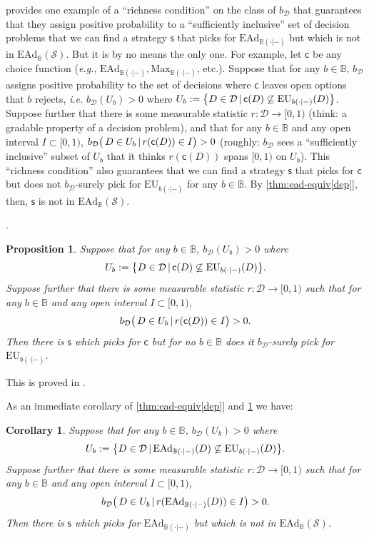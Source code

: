 \documentclass[a4paper,final]{article}
\newtheorem{proposition}[theorem]{Proposition}
\newtheorem{corollary}[theorem]{Corollary}
\newcommand\EU{\mathrm{EU}}
\newcommand\EAd{\mathrm{EAd}}
\newcommand\Maximality{\mathrm{Max}}
\newcommand{\Decs}{\mathcal{D}}
\renewcommand\S{\mathcal{S}}
\newcommand\s{\mathsf{s}}
\renewcommand\c{\mathsf{c}} %
\newcommand{\IB}{\mathbb{B}}
\renewcommand{\color}[1]{}
\newenvironment{colored}[1]{\leavevmode\color{#1}}{}
\newcommand{\Strategies}{\S}
\newcommand\SetDelimiter[1][]{
	\nonscript\,#1\vert \allowbreak \nonscript\,\mathopen{}}
\providecommand\given{\SetDelimiter}
\newenvironment{CCM rewritten}
{\begingroup\color{blue}} %
{\endgroup}              %
\begin{document}
\begin{colored}{blue}
 provides one example of a ``richness condition'' on the class of $b_\Decs$ that guarantees that they assign positive probability to a ``sufficiently inclusive'' set of decision problems that we can find a strategy $\s$ that picks for $\EAd_{\IB(\cdot|-)}$ but which is not in $\EAd_{\IB}(\S)$. But it is by no means the only one. For example, let $\c$ be any choice function (\textit{e.g.}, $\EAd_{\IB(\cdot|-)}, \Maximality_{\IB(\cdot|-)}$, etc.). Suppose that for any $b\in\IB$, $b_\Decs$ assigns positive probability to the set of decisions where $\c$ leaves open options that $b$ rejects, \textit{i.e.} $b_\Decs(U_b)>0$ where $U_b:=\bigl\{D\in\Decs\given \c(D)\not \subseteq\EU_{b(\cdot|-)}(D)\bigr\}$. Suppose further that there is some measurable statistic $r:\Decs\rightarrow[0,1)$ (think: a gradable property of a decision problem), and that for any $b\in\IB$ and any open interval $I\subset[0,1)$, $b_\Decs\bigl(\,D\in U_b\given r(\c(D))\in I \bigr)>0$ (roughly: $b_\Decs$ sees a ``sufficiently inclusive'' subset of $U_b$ that it thinks $r(\c(D))$ spans $[0,1)$ on $U_b$). This ``richness condition'' also guarantees that we can find a strategy $\s$ that picks for $\c$ but does not $b_\Decs$-surely pick for $\EU_{b(\cdot|-)}$ for any $b\in\IB$. By \cref{thm:ead-equiv[dep]}, then, $\s$ is not in $\EAd_\IB(\Strategies)$.


.
 



\begin{proposition}\label{thm:seed-suff-impermissible-strat}
Suppose that for any $b\in\IB$, $b_\Decs(U_b)>0$ where 
\[
U_b:=\bigl\{D\in\Decs\given \c(D)\not \subseteq\EU_{b(\cdot|-)}(D)\bigr\}.
\] 
Suppose further that there is some measurable statistic $r:\Decs\rightarrow[0,1)$ such that for any $b\in\IB$ and any open interval $I\subset[0,1)$, 
\[
b_\Decs\bigl(\,D\in U_b\given r(\c(D))\in I \bigr)>0.
\]
Then there is $\s$ which picks for $\c$ but for no $b\in\IB$ does it $b_\Decs$-surely pick for $\EU_{b(\cdot|-)}$.

\end{proposition}
This is proved in .

As an immediate corollary of \cref{thm:ead-equiv[dep]} and \cref{thm:seed-suff-impermissible-strat} we have:

\begin{corollary}\label{thm:seed-suff-eadimpermissible-strat}
Suppose that for any $b\in\IB$, $b_\Decs(U_b)>0$ where 
\[
U_b:=\bigl\{D\in\Decs\given \EAd_{\IB(\cdot|-)}(D)\not \subseteq\EU_{b(\cdot|-)}(D)\bigr\}.
\] 
Suppose further that there is some measurable statistic $r:\Decs\rightarrow[0,1)$ such that for any $b\in\IB$ and any open interval $I\subset[0,1)$, 
\[
b_\Decs\bigl(\,D\in U_b\given r(\EAd_{\IB(\cdot|-)}(D))\in I \bigr)>0.
\]
Then there is $\s$ which picks for $\EAd_{\IB(\cdot|-)}$ but which is not in $\EAd_{\IB}(\S)$.
\end{corollary}
\end{colored}
\end{document}

